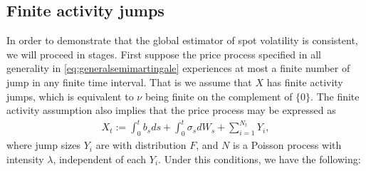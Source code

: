\subsection{Finite activity \levy jumps}
In order to demonstrate that the global estimator of spot volatility is consistent, we will proceed in stages.  First suppose the price process specified in all generality in \eqref{eq:generalsemimartingale} experiences at most a finite number of jump in any finite time interval. That is we assume that $X$ has finite activity jumps, which is equivalent to $\nu$ being finite on the complement of   $\{0\}$. The finite activity assumption also implies that the price process may be expressed as  
\begin{align}
  X_t :=  \int_0^t b_s d s + \int_0^t \sigma_s dW_s +  \sum^{N_t}_{ i = 1} Y_i,
  \label{jumpfa}
\end{align}
where jump sizes $Y_i$ are \iid with distribution $F$, and $N$ is a Poisson process with intensity $\lambda$, independent of each $Y_i$. Under this conditions, we have the following:

